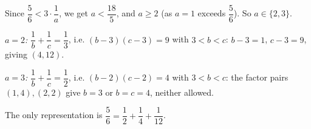 Since $\dfrac56<3\cdot\dfrac1a$, we get $a<\dfrac{18}5$, and $a\ge2$ (as $a=1$ exceeds $\dfrac56$). So $a\in\{2,3\}$.

\emph{$a=2$:} $\dfrac1b+\dfrac1c=\dfrac13$, i.e. $(b-3)(c-3)=9$ with $3<b<c$: $b-3=1$, $c-3=9$, giving $(4,12)$.

\emph{$a=3$:} $\dfrac1b+\dfrac1c=\dfrac12$, i.e. $(b-2)(c-2)=4$ with $3<b<c$: the factor pairs $(1,4),(2,2)$ give $b=3$ or $b=c=4$, neither allowed.

The only representation is $\boxed{\dfrac56=\dfrac12+\dfrac14+\dfrac1{12}}$.
